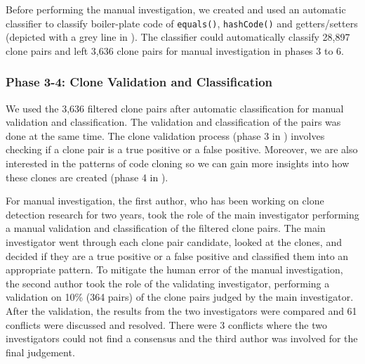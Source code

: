\documentclass[sigconf,review, anonymous]{acmart}
\begin{document}
Before performing the manual
investigation, we created and used an automatic classifier 
to classify boiler-plate code of {\small\texttt{equals()}}, 
{\small\texttt{hashCode()}} and getters/setters 
(depicted with a grey line in ).
The classifier could automatically classify 28,897 clone pairs 
and left 3,636 clone pairs for manual investigation in phases 3 to 6.

\subsubsection{Phase 3-4: Clone Validation and Classification}
We used the 3,636 filtered clone pairs after automatic classification for
manual validation and classification.
The validation and classification of the pairs was done at the same time. 
The clone validation process (phase 3 in ) involves checking 
if a clone pair is a true positive or a false positive. 
Moreover, we are also interested in 
the patterns of code cloning so we can gain more insights into 
how these clones are created (phase 4 in ). 

For manual investigation, the first author, who has been working on clone detection research for 
two years, took the role of the main investigator performing a manual 
validation and classification of the filtered clone pairs. 
The main investigator went through each clone pair candidate, 
looked at the clones, and decided if they are a true positive or a
false positive and classified them into an appropriate pattern. 
To mitigate the human error of the manual investigation, 
the second author took the role of the validating investigator, performing a
validation on 10\% (364 pairs) of the clone pairs judged by the main
investigator. After the validation, the results from the two
investigators were compared and 61 conflicts were discussed and resolved.
There were 3 conflicts where the two investigators could not find a consensus 
and the third author was involved for the final judgement.
\end{document}
